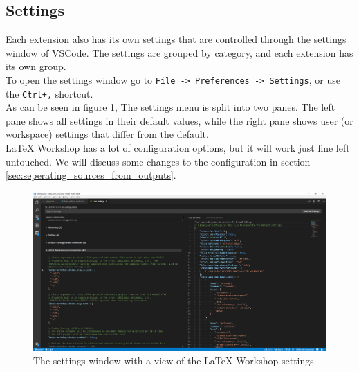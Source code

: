 \documentclass{article}
\newcommand{\latex}{\LaTeX\xspace}
\begin{document}
\subsection{Settings}
Each extension also has its own settings that are controlled through the settings window of VSCode. The settings are grouped by category, and each extension has its own group.\\
To open the settings window go to \texttt{File -> Preferences -> Settings}, or use the \texttt{Ctrl+,} shortcut.\\
As can be seen in figure \ref{fig:settings_window}, The settings menu is split into two panes. The left pane shows all settings in their default values, while the right pane shows user (or workspace) settings that differ from the default.\\
\latex Workshop has a lot of configuration options, but it will work just fine left untouched. We will discuss some changes to the configuration in section \ref{sec:seperating_sources_from_outputs}.
\begin{figure}
	\includegraphics[width=\linewidth]{../resources/settings_window.png}
	\caption{The settings window with a view of the \latex Workshop settings}
	\label{fig:settings_window}
\end{figure}
\end{document}
